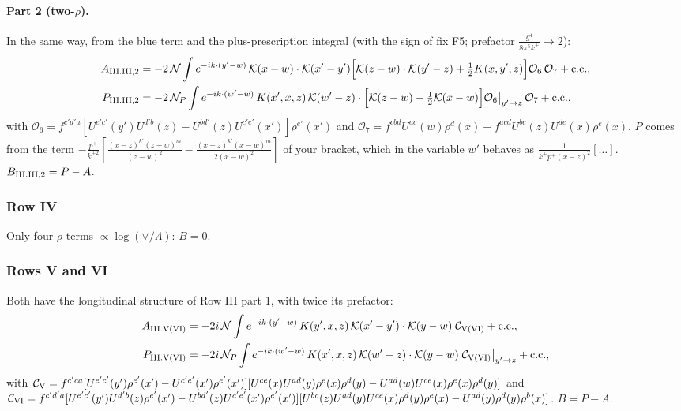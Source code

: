 \documentclass[10pt]{article}
\numberwithin{equation}{section}
\newcommand{\KK}{\mathcal K}
\newcommand{\NN}{\mathcal N}
\newcommand{\NP}{\mathcal N_{P}}
\newcommand{\pp}{p^+}
\begin{document}
\paragraph{Part 2 (two-$\rho$).} In the same way, from the blue term and the plus-prescription integral (with the sign of fix F5; prefactor $\frac{g^4}{8\pi^5k^+}\to2$):
\begin{align}
A_{\rm III.III,2}&=-2\,\NN\int e^{-ik\cdot(y'-w)}\,\KK(x-w)\cdot\KK(x'-y')\Big[\KK(z-w)\cdot\KK(y'-z)+\tfrac12K(x,y',z)\Big]\mathcal O_6\,\mathcal O_7+{\rm c.c.},\notag\\
P_{\rm III.III,2}&=-2\,\NP\int e^{-ik\cdot(w'-w)}\,K(x',x,z)\,\KK(w'-z)\cdot\Big[\KK(z-w)-\tfrac12\KK(x-w)\Big]\mathcal O_6\big|_{y'\to z}\,\mathcal O_7+{\rm c.c.},
\end{align}
with $\mathcal O_6=f^{c'd'a}[U^{e'c'}(y')U^{d'b}(z)-U^{bd'}(z)U^{c'e'}(x')]\rho^{e'}(x')$ and $\mathcal O_7=f^{cbd}U^{ac}(w)\rho^d(x)-f^{acd}U^{bc}(z)U^{de}(x)\rho^e(x)$. $P$ comes from the term $-\frac{\pp}{k^{+2}}[\frac{(x-z)^{k'}(z-w)^m}{(z-w)^2}-\frac{(x-z)^{k'}(x-w)^m}{2(x-w)^2}]$ of your bracket, which in the variable $w'$ behaves as $\frac{1}{k^+\pp(x-z)^2}[\dots]$. $B_{\rm III.III,2}=P-A$.

\subsubsection{Row IV}
Only four-$\rho$ terms $\propto\log(\vee/\Lambda)$: \textbf{$B=0$}.

\subsubsection{Rows V and VI}
Both have the longitudinal structure of Row III part 1, with twice its prefactor:
\begin{align}
A_{\rm III.V(VI)}&=-2i\,\NN\int e^{-ik\cdot(y'-w)}\,K(y',x,z)\,\KK(x'-y')\cdot\KK(y-w)\;\mathcal C_{\rm V(VI)}+{\rm c.c.},\notag\\
P_{\rm III.V(VI)}&=-2i\,\NP\int e^{-ik\cdot(w'-w)}\,K(x',x,z)\,\KK(w'-z)\cdot\KK(y-w)\;\mathcal C_{\rm V(VI)}\big|_{y'\to z}+{\rm c.c.},
\end{align}
with $\mathcal C_{\rm V}=f^{c'ca}[U^{e'c'}(y')\rho^{e'}(x')-U^{c'e'}(x')\rho^{e'}(x')][U^{ce}(x)U^{ad}(y)\rho^e(x)\rho^d(y)-U^{ad}(w)U^{ce}(x)\rho^e(x)\rho^d(y)]$ and $\mathcal C_{\rm VI}=f^{c'd'a}[U^{e'c'}(y')U^{d'b}(z)\rho^{e'}(x')-U^{bd'}(z)U^{c'e'}(x')\rho^{e'}(x')][U^{bc}(z)U^{ad}(y)U^{ce}(x)\rho^d(y)\rho^e(x)-U^{ad}(y)\rho^d(y)\rho^b(x)]$. $B=P-A$.
\end{document}
